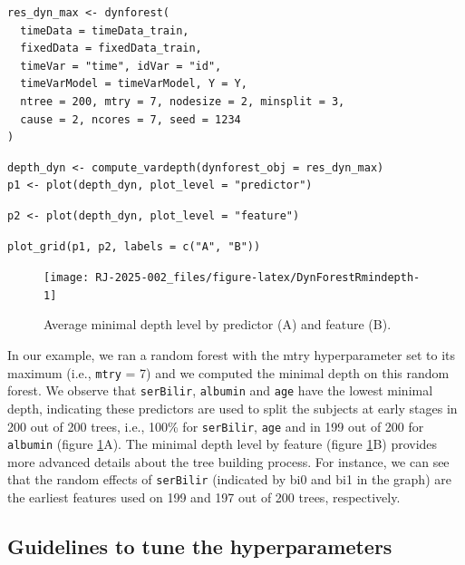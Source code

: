 \begin{verbatim}
res_dyn_max <- dynforest(
  timeData = timeData_train,
  fixedData = fixedData_train,
  timeVar = "time", idVar = "id",
  timeVarModel = timeVarModel, Y = Y,
  ntree = 200, mtry = 7, nodesize = 2, minsplit = 3,
  cause = 2, ncores = 7, seed = 1234
)
\end{verbatim}

\begin{verbatim}
depth_dyn <- compute_vardepth(dynforest_obj = res_dyn_max)
p1 <- plot(depth_dyn, plot_level = "predictor")
\end{verbatim}

\begin{verbatim}
p2 <- plot(depth_dyn, plot_level = "feature")
\end{verbatim}

\begin{verbatim}
plot_grid(p1, p2, labels = c("A", "B"))
\end{verbatim}

\begin{figure}

{\centering \texttt{[image: RJ-2025-002\_files/figure-latex/DynForestRmindepth-1]} 

}

\caption{Average minimal depth level by predictor (A) and feature (B).}\label{fig:DynForestRmindepth}
\end{figure}

In our example, we ran a random forest with the mtry hyperparameter set to its maximum (i.e., \texttt{mtry} = 7) and we computed the minimal depth on this random forest. We observe that \texttt{serBilir}, \texttt{albumin} and \texttt{age} have the lowest minimal depth, indicating these predictors are used to split the subjects at early stages in 200 out of 200 trees, i.e., 100\% for \texttt{serBilir}, \texttt{age} and in 199 out of 200 for \texttt{albumin} (figure \ref{fig:DynForestRmindepth}A). The minimal depth level by feature (figure \ref{fig:DynForestRmindepth}B) provides more advanced details about the tree building process. For instance, we can see that the random effects of \texttt{serBilir} (indicated by bi0 and bi1 in the graph) are the earliest features used on 199 and 197 out of 200 trees, respectively.

\subsection{Guidelines to tune the hyperparameters}\label{guidelines-to-tune-the-hyperparameters}

